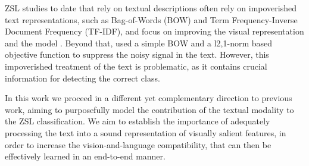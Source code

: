 \documentclass[11pt,a4paper]{article}
\begin{document}






ZSL studies to date that rely on textual descriptions  often rely on impoverished  text representations, such as Bag-of-Words (BOW) and Term Frequency-Inverse Document Frequency (TF-IDF), and focus on improving the visual representation and the model \cite{lei2015predicting,elhoseiny2013write,elhoseiny2016write,elhoseiny2017link,zhu2018generative}. Beyond that,  \citet{qiao2016less} used a simple BOW and a l2,1-norm based objective function to suppress the noisy signal in the text. However, this impoverished treatment of the text  is problematic, as it contains crucial information for detecting the correct class. 

In this work we proceed in  a different yet complementary direction to previous work, aiming to purposefully  model the contribution of the textual modality to the ZSL classification.
We aim to establish the importance of adequately processing the text into a sound representation of  visually salient features, in order to  increase the vision-and-language compatibility, that can then be effectively learned in an end-to-end manner.
\end{document}
